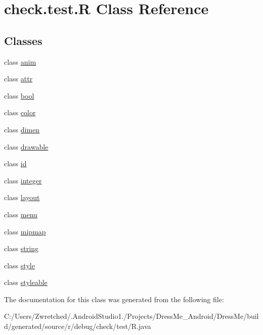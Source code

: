 \hypertarget{classcheck_1_1test_1_1_r}{}\section{check.\+test.\+R Class Reference}
\label{classcheck_1_1test_1_1_r}
\subsection*{Classes}
\begin{DoxyCompactItemize}
\item 
class \hyperlink{classcheck_1_1test_1_1_r_1_1anim}{anim}
\item 
class \hyperlink{classcheck_1_1test_1_1_r_1_1attr}{attr}
\item 
class \hyperlink{classcheck_1_1test_1_1_r_1_1bool}{bool}
\item 
class \hyperlink{classcheck_1_1test_1_1_r_1_1color}{color}
\item 
class \hyperlink{classcheck_1_1test_1_1_r_1_1dimen}{dimen}
\item 
class \hyperlink{classcheck_1_1test_1_1_r_1_1drawable}{drawable}
\item 
class \hyperlink{classcheck_1_1test_1_1_r_1_1id}{id}
\item 
class \hyperlink{classcheck_1_1test_1_1_r_1_1integer}{integer}
\item 
class \hyperlink{classcheck_1_1test_1_1_r_1_1layout}{layout}
\item 
class \hyperlink{classcheck_1_1test_1_1_r_1_1menu}{menu}
\item 
class \hyperlink{classcheck_1_1test_1_1_r_1_1mipmap}{mipmap}
\item 
class \hyperlink{classcheck_1_1test_1_1_r_1_1string}{string}
\item 
class \hyperlink{classcheck_1_1test_1_1_r_1_1style}{style}
\item 
class \hyperlink{classcheck_1_1test_1_1_r_1_1styleable}{styleable}
\end{DoxyCompactItemize}


The documentation for this class was generated from the following file\+:\begin{DoxyCompactItemize}
\item 
C\+:/\+Users/\+Zwretched/.\+Android\+Studio1./\+Projects/\+Dress\+Me\+\_\+\+Android/\+Dress\+Me/build/generated/source/r/debug/check/test/R.\+java\end{DoxyCompactItemize}
